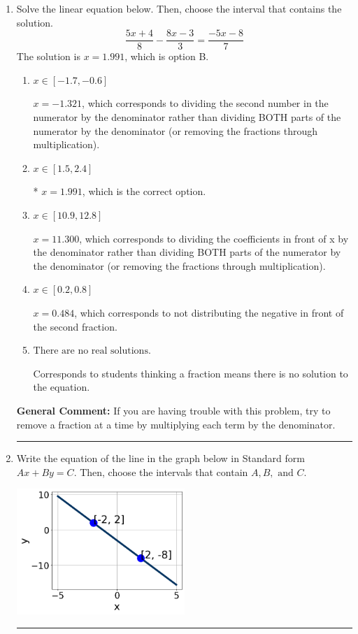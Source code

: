 \documentclass{extbook}[14pt]
\newcommand{\litem}[1]{\item #1

\rule{\textwidth}{0.4pt}}
\begin{document}
\begin{enumerate}\litem{
Solve the linear equation below. Then, choose the interval that contains the solution.
\[ \frac{5x + 4}{8} - \frac{8x -3}{3} = \frac{-5x -8}{7} \]The solution is \( x = 1.991 \), which is option B.\begin{enumerate}[label=\Alph*.]
\item \( x \in [-1.7, -0.6] \)

 $x = -1.321$, which corresponds to dividing the second number in the numerator by the denominator rather than dividing BOTH parts of the numerator by the denominator (or removing the fractions through multiplication).
\item \( x \in [1.5, 2.4] \)

* $x = 1.991$, which is the correct option.
\item \( x \in [10.9, 12.8] \)

 $x = 11.300$, which corresponds to dividing the coefficients in front of x by the denominator rather than dividing BOTH parts of the numerator by the denominator (or removing the fractions through multiplication).
\item \( x \in [0.2, 0.8] \)

 $x = 0.484$, which corresponds to not distributing the negative in front of the second fraction.
\item \( \text{There are no real solutions.} \)

Corresponds to students thinking a fraction means there is no solution to the equation.
\end{enumerate}

\textbf{General Comment:} If you are having trouble with this problem, try to remove a fraction at a time by multiplying each term by the denominator.
}
\litem{
Write the equation of the line in the graph below in Standard form $Ax+By=C$. Then, choose the intervals that contain $A, B, \text{ and } C$.

\begin{center}
    \includegraphics[width=0.5\textwidth]{../Figures/linearGraphToStandardC.png}
\end{center}


}
\end{enumerate}
\end{document}
